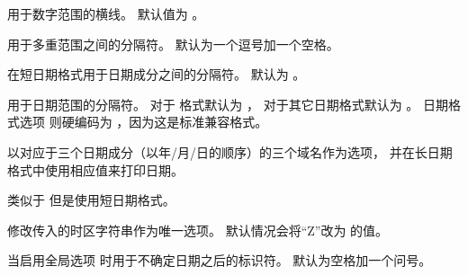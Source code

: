 \begin{ltxsyntax}


用于数字范围的横线。
默认值为 。


用于多重范围之间的分隔符。
默认为一个逗号加一个空格。


在短日期格式用于日期成分之间的分隔符。
默认为 。


用于日期范围的分隔符。
对于  格式默认为 ，
对于其它日期格式默认为 。
日期格式选项  则硬编码为 ，因为这是标准兼容格式。



以对应于三个日期成分（以年/月/日的顺序）的三个域名作为选项，
并在长日期格式中使用相应值来打印日期。


类似于  但是使用短日期格式。


修改传入的时区字符串作为唯一选项。
默认情况会将“Z”改为  的值。


当启用全局选项  时用于不确定日期之后的标识符。
默认为空格加一个问号。


\end{ltxsyntax}
